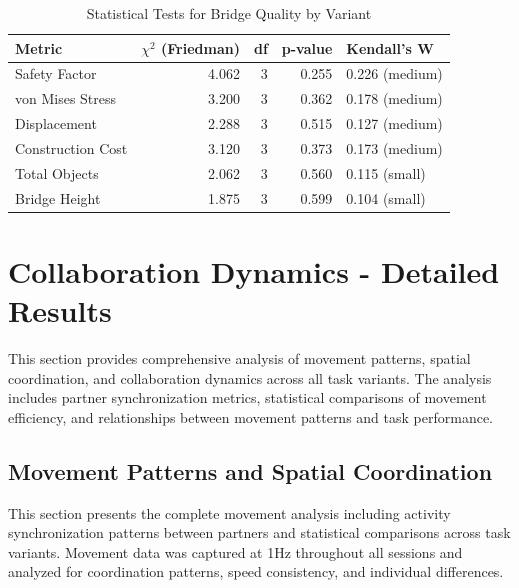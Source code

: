 \begin{table}[H]
\centering
\caption{Statistical Tests for Bridge Quality by Variant}
\label{tab:bridge_quality_tests_complete}
\begin{tabular}{lrrrl}
\toprule
\textbf{Metric} & \textbf{$\chi^2$ (Friedman)} & \textbf{df} & \textbf{p-value} & \textbf{Kendall's W} \\
\midrule
Safety Factor & 4.062 & 3 & 0.255 & 0.226 (medium) \\
von Mises Stress & 3.200 & 3 & 0.362 & 0.178 (medium) \\
Displacement & 2.288 & 3 & 0.515 & 0.127 (medium) \\
Construction Cost & 3.120 & 3 & 0.373 & 0.173 (medium) \\
Total Objects & 2.062 & 3 & 0.560 & 0.115 (small) \\
Bridge Height & 1.875 & 3 & 0.599 & 0.104 (small) \\
\bottomrule
\end{tabular}
\end{table}

\section{Collaboration Dynamics - Detailed Results}  
\label{appendix:movement_results}

This section provides comprehensive analysis of movement patterns, spatial coordination, and collaboration dynamics across all task variants. The analysis includes partner synchronization metrics, statistical comparisons of movement efficiency, and relationships between movement patterns and task performance.

\subsection{Movement Patterns and Spatial Coordination}

This section presents the complete movement analysis including activity synchronization patterns between partners and statistical comparisons across task variants. Movement data was captured at 1Hz throughout all sessions and analyzed for coordination patterns, speed consistency, and individual differences.

